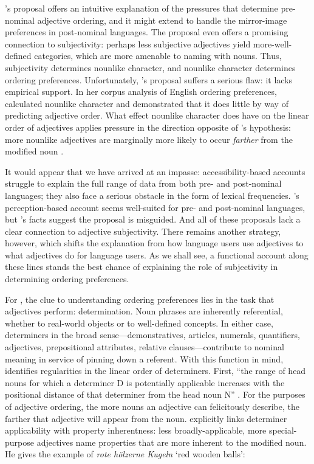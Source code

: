 \documentclass{sp}
\begin{document}
\citeauthor{bever1970}'s proposal offers an intuitive explanation of the pressures that determine pre-nominal adjective ordering, and it might extend to handle the mirror-image preferences in post-nominal languages. The proposal even offers a promising connection to subjectivity: perhaps less subjective adjectives yield more-well-defined categories, which are more amenable to naming with nouns. Thus, subjectivity determines nounlike character, and nounlike character determines ordering preferences. Unfortunately, \citeauthor{bever1970}'s proposal suffers a serious flaw: it lacks empirical support. In her corpus analysis of English ordering preferences, \cite{wulff2003} %
calculated nounlike character and demonstrated that it does little by way of predicting adjective order. What effect nounlike character does have on the linear order of adjectives applies pressure in the direction opposite of \citeauthor{bever1970}'s hypothesis: more nounlike adjectives are marginally more likely to occur \emph{farther} from the modified noun .

It would appear that we have arrived at an impasse: accessibility-based accounts struggle to explain the full range of data from both pre- and post-nominal languages; they also face a serious obstacle in the form of lexical frequencies. \citeauthor{bever1970}'s perception-based account seems well-suited for pre- and post-nominal languages, but \citeauthor{wulff2003}'s facts suggest the proposal is misguided. And all of these proposals lack a clear connection to adjective subjectivity. There remains another strategy, however, which shifts the explanation from how language users use adjectives to what adjectives do for language users. As we shall see, a functional account along these lines stands the best chance of explaining the role of subjectivity in determining ordering preferences.

For \cite{seiler1978}, the clue to understanding ordering preferences lies in the task that adjectives perform: determination. Noun phrases are inherently referential, whether to real-world objects or to well-defined concepts. In either case, determiners in the broad sense---demonstratives, articles, numerals, quantifiers, adjectives, prepositional attributes, relative clauses---contribute to nominal meaning in service of pinning down a referent. With this function in mind, \citeauthor{seiler1978} identifies regularities in the linear order of determiners. First, ``the range of head nouns for which a determiner D is potentially applicable increases with the positional distance of that determiner from the head noun N'' . For the purposes of adjective ordering, the more nouns an adjective can felicitously describe, the farther that adjective will appear from the noun. \citeauthor{seiler1978} explicitly links determiner applicability with property inherentness: less broadly-applicable, more special-purpose adjectives name properties that are more inherent to the modified noun. He gives the example of \emph{rote h\"{o}lzerne Kugeln} `red wooden balls':
\end{document}
